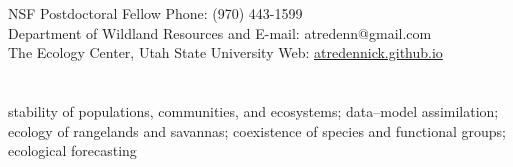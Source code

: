 \documentclass[margin,line]{resume}
\begin{document}
\begin{resume}

    \section{\textmd{\textsf{\color{MidnightBlue}{Contact\\Information}}}}

    NSF Postdoctoral Fellow      							 \hfill Phone: (970) 443-1599            \vspace{0mm}\\\vspace{0mm}%
    Department of Wildland Resources and    		          \hfill E-mail: atredenn@gmail.com    \vspace{0mm}\\\vspace{0mm}%
    The Ecology Center, Utah State University      	          \hfill Web: \href{http://atredennick.github.io}{atredennick.github.io}  \vspace{0mm}\\\vspace{-4.5mm}%

    \section{\textmd{\textsf{\color{MidnightBlue}{Research\\Interests}}}}
		stability of populations, communities, and ecosystems; data--model assimilation; ecology of rangelands and savannas; coexistence of species and functional groups; ecological forecasting %

\end{resume}
\end{document}
